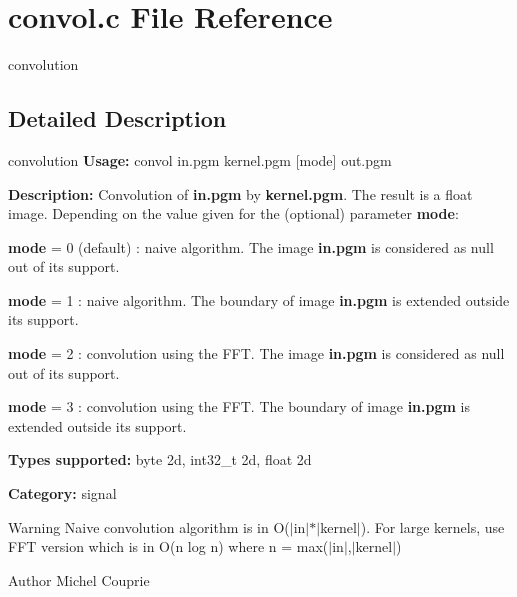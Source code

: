 \section{convol.c File Reference}
\label{convol_8c}


convolution  




\subsection{Detailed Description}
convolution {\bfseries Usage:} convol in.pgm kernel.pgm [mode] out.pgm

{\bfseries Description:} Convolution of {\bfseries in.pgm} by {\bfseries kernel.pgm}. The result is a float image. Depending on the value given for the (optional) parameter {\bfseries mode}: \begin{DoxyItemize}
\item {\bfseries mode} = 0 (default) : naive algorithm. The image {\bfseries in.pgm} is considered as null out of its support. \item {\bfseries mode} = 1 : naive algorithm. The boundary of image {\bfseries in.pgm} is extended outside its support. \item {\bfseries mode} = 2 : convolution using the FFT. The image {\bfseries in.pgm} is considered as null out of its support. \item {\bfseries mode} = 3 : convolution using the FFT. The boundary of image {\bfseries in.pgm} is extended outside its support.\end{DoxyItemize}
{\bfseries Types supported:} byte 2d, int32\_\-t 2d, float 2d

{\bfseries Category:} signal

\begin{DoxyWarning}{Warning}
Naive convolution algorithm is in O($|$in$|$$\ast$$|$kernel$|$). For large kernels, use FFT version which is in O(n log n) where n = max($|$in$|$,$|$kernel$|$)
\end{DoxyWarning}
\begin{DoxyAuthor}{Author}
Michel Couprie 
\end{DoxyAuthor}

